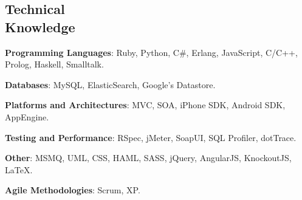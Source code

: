\documentclass[margin,line]{resume}
\begin{document}
\begin{resume}
\newpage


\section{\mysidestyle Technical\\Knowledge}

\textbf{Programming Languages}: Ruby, Python, C\#, Erlang, JavaScript, C/C++, Prolog, Haskell, Smalltalk. \vspace{-2mm}
    
\textbf{Databases}: MySQL, ElasticSearch, Google's Datastore. \vspace{-2mm}

\textbf{Platforms and Architectures}: MVC, SOA, iPhone SDK, Android SDK, AppEngine. \vspace{-2mm}

\textbf{Testing and Performance}: RSpec, jMeter, SoapUI, SQL Profiler, dotTrace.\vspace{-2mm}
   
\textbf{Other}: MSMQ, UML, CSS, HAML, SASS, jQuery, AngularJS, KnockoutJS, \LaTeX . \vspace{-2mm}
    
\textbf{Agile Methodologies}: Scrum, XP. \vspace{-2mm}
    

\end{resume}
\end{document}
